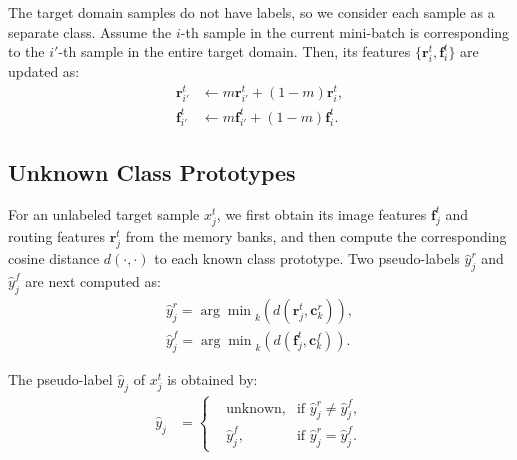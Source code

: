 \documentclass[10pt,twocolumn,letterpaper]{article}
\begin{document}
The target domain samples do not have labels, so we consider each sample as a separate class. Assume the $i$-th sample in the current mini-batch is corresponding to the $i'$-th sample in the entire target domain. Then, its features $\{\bm{r}^t_i, \bm{f}^t_i\}$ are updated as:
\begin{align}
\bm{r}_{i'}^t &\leftarrow m\bm{r}_{i'}^t + (1-m)\bm{r}^t_{i}, \\
\bm{f}_{i'}^t &\leftarrow m\bm{f}_{i'}^t + (1-m)\bm{f}^t_{i}. \label{eq:m_ins}
\end{align}

\subsection{Unknown Class Prototypes} \label{sec:prototype}

For an unlabeled target sample $x_j^t$, we first obtain its image features $\bm{f}^{t}_j$ and routing features $\bm{r}^{t}_j$ from the memory banks, and then compute the corresponding cosine distance $d(\cdot, \cdot)$ to each known class prototype. Two pseudo-labels $\hat{y}^{r}_j$ and $\hat{y}^{f}_j$ are next computed as:
\begin{align}
	\hat{y}^{r}_j =  {\arg\min}_{k}( d(\bm{r}^{t}_j, \bm{c}_{k}^{r})),\\
  \hat{y}^{f}_j =  {\arg\min}_{k}(d(\bm{f}^{t}_j, \bm{c}_{k}^{f})).
\end{align}

The pseudo-label $\hat{y}_j$ of $x_j^t$ is obtained by:
\begin{align}
    \hat{y}_j &= \left\{
    \begin{aligned}
     &\text{unknown}, &\text{if $\hat{y}^{r}_j \neq \hat{y}^{f}_j$},\\
     &\hat{y}^{f}_j, &\text{if $\hat{y}^{r}_j = \hat{y}^{f}_j$}.
    \end{aligned}
    \right.
    \end{align}
\end{document}
